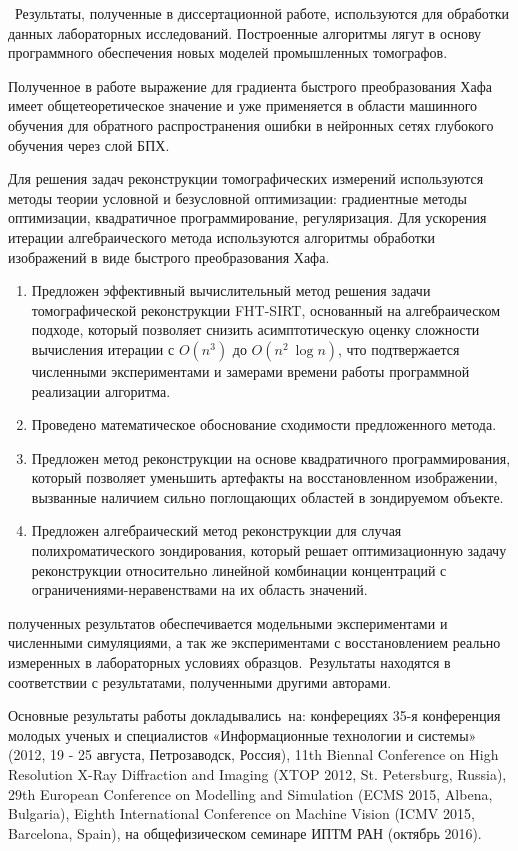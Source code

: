 {\influence} ~Результаты, полученные в диссертационной работе, используются для обработки данных лабораторных исследований. Построенные алгоритмы лягут в основу программного обеспечения новых моделей промышленных томографов.

Полученное в работе выражение для градиента быстрого преобразования Хафа имеет общетеоретическое значение и уже применяется в области машинного обучения для обратного распространения ошибки в нейронных сетях глубокого обучения через слой БПХ.

{\methods}
Для решения задач реконструкции томографических измерений используются методы теории условной и безусловной оптимизации: градиентные методы оптимизации, квадратичное программирование, регуляризация.
Для ускорения итерации алгебраического метода используются алгоритмы обработки изображений в виде быстрого преобразования Хафа.


{}
\begin{enumerate}
  \item Предложен эффективный вычислительный метод решения задачи томографической реконструкции FHT-SIRT, основанный на алгебраическом подходе, который позволяет снизить асимптотическую оценку сложности вычисления итерации с $O(n^3)$ до $O(n^2~\log n)$, что подтвержается численными экспериментами и замерами времени работы программной реализации алгоритма.
  \item Проведено математическое обоснование сходимости предложенного метода.
  \item Предложен метод реконструкции на основе квадратичного программирования, который позволяет уменьшить артефакты на восстановленном изображении, вызванные наличием сильно поглощающих областей в зондируемом объекте.
  \item Предложен алгебраический метод реконструкции для случая полихроматического зондирования, который решает оптимизационную задачу реконструкции относительно линейной комбинации концентраций с ограничениями-неравенствами на их область значений.
\end{enumerate}


{\reliability} полученных результатов обеспечивается модельными экспериментами и численными симуляциями, а так же экспериментами с восстановлением реально измеренных в лабораторных условиях образцов.\ Результаты находятся в соответствии с результатами, полученными другими авторами.


{\probation}
Основные результаты работы докладывались~на: конферециях 
35-я конференция молодых ученых и специалистов «Информационные технологии и системы» (2012, 19 - 25 августа, Петрозаводск, Россия),
11th Biennal Conference on High Resolution X-Ray Diffraction and Imaging (XTOP 2012, St. Petersburg, Russia), 
29th European Conference on Modelling and Simulation (ECMS 2015, Albena, Bulgaria),
Eighth International Conference on Machine Vision (ICMV 2015, Barcelona, Spain),
на общефизическом семинаре ИПТМ РАН (октябрь 2016).

